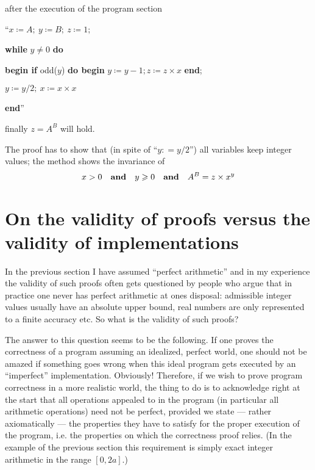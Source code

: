 \begin{enumerate}[leftmargin=*, itemindent=3\parindent, label=\textit{Remark }\arabic*.]
	after the execution of the program section
	
	{
		\setlength{\parindent}{8em}
		\hspace{-.4em}``$x \coloneq A;\ y \coloneq B;\ z \coloneq 1;$
		
		\textbf{while} $y \neq 0$ \textbf{do}
		
		\quad\textbf{begin if} odd($y$) \textbf{do begin} $y \coloneq y - 1; z \coloneq z \times x$ \textbf{end};
		
		\quad\quad $y \coloneq y/2;\ x \coloneq x \times x$
		
		\quad\textbf{end}''
	}
	
	finally $z = A^B$ will hold.
\end{enumerate}


The proof has to show that (in spite of ``$y: = y/2$'') all variables keep integer values; the method shows the invariance of
$$
x > 0\quad \text{\textbf{and}}\quad y \geqslant 0\quad \text{\textbf{and}}\quad A^B = z \times x^y
$$

\section{On the validity of proofs versus the validity of implementations}

In the previous section I have assumed ``perfect arithmetic'' and in my experience the validity of such proofs often gets questioned by people who argue that in practice one never has perfect arithmetic at ones disposal: admissible integer values usually have an absolute upper bound, real numbers are only represented to a finite accuracy etc. So what is the validity of such proofs?

The answer to this question seems to be the following. If one proves the correctness of a program assuming an idealized, perfect world, one should not be amazed if something goes wrong when this ideal program gets executed by an ``imperfect'' implementation. Obviously! Therefore, if we wish to prove program correctness in a more realistic world, the thing to do is to acknowledge right at the start that all operations appealed to in the program (in particular all arithmetic operations) need not be perfect, provided we state --- rather axiomatically --- the properties they have to satisfy for the proper execution of the program, i.e. the properties on which the correctness proof relies. (In the example of the previous section this requirement is simply exact integer arithmetic in the range $[0, 2a]$.)

